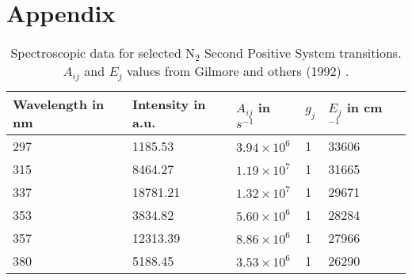 \appendix
\chapter*{Appendix}
\begin{table}[h]
    \centering
    \caption{Spectroscopic data for selected N$_2$ Second Positive System transitions. $A_{ij}$ and $E_j$ values from Gilmore and others (1992) \cite{coefficients}.}
    \vspace*{1em}
    \begin{tabular}{llllll}
    {Wavelength in nm} & {Intensity in a.u.} & $A_{ij}$ in {$s^{-1}$} & $g_j$ & $E_j$ in {cm$^{-1}$} \\
    \hline
    297 & 1185.53  & $3.94 \times 10^6$ & 1 & 33606 \\
    315 & 8464.27  & $1.19 \times 10^7$ & 1 & 31665 \\
    337 & 18781.21 & $1.32 \times 10^7$ & 1 & 29671 \\
    353 & 3834.82  & $5.60 \times 10^6$ & 1 & 28284 \\
    357 & 12313.39 & $8.86 \times 10^6$ & 1 & 27966 \\
    380 & 5188.45  & $3.53 \times 10^6$ & 1 & 26290 \\

    \end{tabular}
    \label{tab:boltzmann}
\end{table}